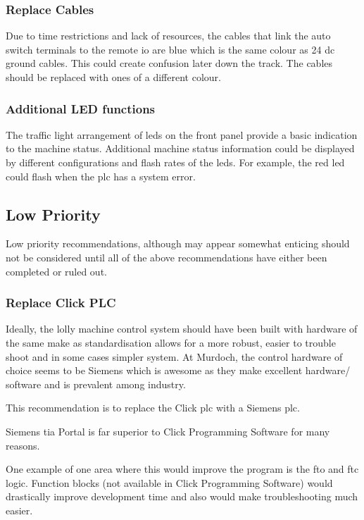         \subsubsection{Replace Cables} 
            Due to time restrictions and lack of resources, the cables that link the auto switch terminals to the remote \acrshort{io} are blue which is the same colour as 24 \acrshort{dc} ground cables. This could create confusion later down the track. The cables should be replaced with ones of a different colour.      
 
        \subsubsection{Additional LED functions}
            The traffic light arrangement of \acrshort{led}s on the front panel provide a basic indication to the machine status. Additional machine status information could be displayed by different configurations and flash rates of the \acrshort{led}s. For example, the red \acrshort{led} could flash when the \acrshort{plc} has a system error.
            
    \subsection{Low Priority}
        Low priority recommendations, although may appear somewhat enticing should not be considered until all of the above recommendations have either been completed or ruled out.
        
        \subsubsection{Replace Click PLC} \label{sec:replacePlc}
            Ideally, the lolly machine control system should have been built with hardware of the same make as standardisation allows for a more robust, easier to trouble shoot and in some cases simpler system. At Murdoch, the control hardware of choice seems to be Siemens which is awesome as they make excellent hardware/ software and is prevalent among industry.
            
            This recommendation is to replace the Click \acrshort{plc} with a Siemens \acrshort{plc}. 
            
            Siemens \acrshort{tia} Portal is far superior to Click Programming Software for many reasons. 
            
            One example of one area where this would improve the program is the \acrshort{fto} and \acrshort{ftc} logic. Function blocks (not available in Click Programming Software) would drastically improve development time and also would make troubleshooting much easier.

